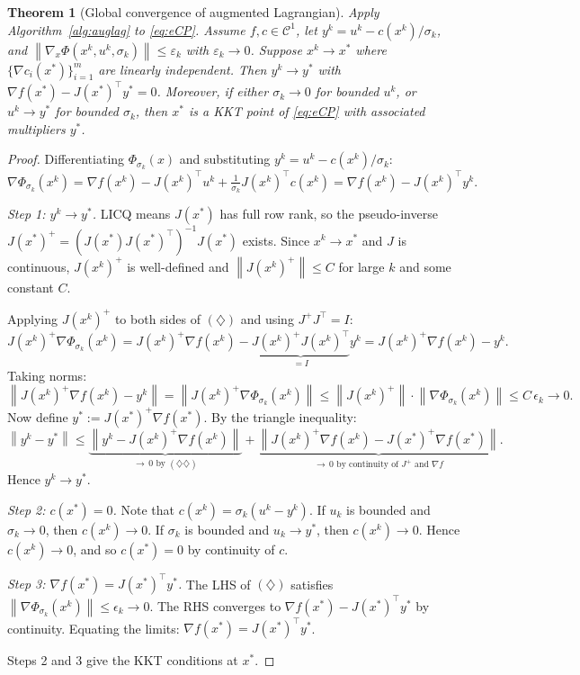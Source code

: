 \documentclass[11pt,a4paper]{report}
\theoremstyle{plain}
\newtheorem{theorem}{Theorem}[chapter]
\theoremstyle{definition}
\newcommand{\norm}[1]{\left\lVert#1\right\rVert}
\newcommand{\grad}{\nabla}
\newcommand{\trans}{^{\top}}
\newcommand{\eps}{\varepsilon}
\begin{document}
\begin{theorem}[Global convergence of augmented Lagrangian]\label{thm:auglag}
Apply Algorithm~\ref{alg:auglag} to \eqref{eq:eCP}. Assume $f,c\in\mathcal{C}^{1}$,
let $y^{k}=u^{k}-c(x^{k})/\sigma_{k}$, and
$\norm{\grad_{x}\Phi(x^{k},u^{k},\sigma_{k})}\le\eps_{k}$ with $\eps_{k}\to 0$.
Suppose $x^{k}\to x^{*}$ where $\{\grad c_{i}(x^{*})\}_{i=1}^{m}$ are linearly
independent. Then $y^{k}\to y^{*}$ with
$\grad f(x^{*})-J(x^{*})\trans y^{*}=0$. Moreover, if either
$\sigma_{k}\to 0$ for bounded $u^{k}$, or $u^{k}\to y^{*}$ for bounded
$\sigma_{k}$, then $x^{*}$ is a KKT point of \eqref{eq:eCP} with associated
multipliers $y^{*}$.
\end{theorem}
\begin{proof}
  Differentiating $\Phi_{\sigma_k}(x)$ and substituting $y^k = u^k - c(x^k)/\sigma_k$:
  \[
  \grad\Phi_{\sigma_k}(x^k) 
  = \grad f(x^k) - J(x^k)\trans u^k + \tfrac{1}{\sigma_k}J(x^k)\trans c(x^k) 
  = \grad f(x^k) - J(x^k)\trans y^k. \tag{$\diamondsuit$}
  \]
  
  \textit{Step 1: $y^k \to y^*$.}
  LICQ means $J(x^*)$ has full row rank, so the pseudo-inverse $J(x^*)^+ = (J(x^*)J(x^*)\trans)^{-1}J(x^*)$ exists. Since $x^k \to x^*$ and $J$ is continuous, $J(x^k)^+$ is well-defined and $\norm{J(x^k)^+} \leq C$ for large $k$ and some constant $C$.
   
  Applying $J(x^k)^+$ to both sides of $(\diamondsuit)$ and using $J^+J\trans = I$:
  \[
  J(x^k)^+\grad\Phi_{\sigma_k}(x^k) 
  = J(x^k)^+\grad f(x^k) - \underbrace{J(x^k)^+J(x^k)\trans}_{= I} y^k 
  = J(x^k)^+\grad f(x^k) - y^k.
  \]
  Taking norms:
  \[
  \norm{J(x^k)^+\grad f(x^k) - y^k} = \norm{J(x^k)^+\grad\Phi_{\sigma_k}(x^k)} \leq \norm{J(x^k)^+}\cdot\norm{\grad\Phi_{\sigma_k}(x^k)} \leq C\,\epsilon_k \to 0. \tag{$\diamondsuit\diamondsuit$}
  \]
  Now define $y^* := J(x^*)^+\grad f(x^*)$. By the triangle inequality:
  \[
  \norm{y^k - y^*} 
  \leq \underbrace{\norm{y^k - J(x^k)^+\grad f(x^k)}}_{\to\,0\text{ by }(\diamondsuit\diamondsuit)} 
  + \underbrace{\norm{J(x^k)^+\grad f(x^k) - J(x^*)^+\grad f(x^*)}}_{\to\,0\text{ by continuity of }J^+\text{ and }\grad f}.
  \]
  Hence $y^k \to y^*$.
   
  \textit{Step 2: $c(x^*) = 0$.}
  Note that $c(x^k) = \sigma_k (u^k - y^k)$. If $u_k$ is bounded and $\sigma_k \to 0$, then $c(x^k) \to 0$. If $\sigma_k$ is bounded and $u_k \to y^*$, then $c(x^k) \to 0$. Hence $c(x^k) \to 0$, and so $c(x^*) = 0$ by continuity of $c$.
   
  \textit{Step 3: $\grad f(x^*) = J(x^*)\trans y^*$.}
  The LHS of $(\diamondsuit)$ satisfies $\norm{\grad\Phi_{\sigma_k}(x^k)} \leq \epsilon_k \to 0$. The RHS converges to $\grad f(x^*) - J(x^*)\trans y^*$ by continuity. Equating the limits: $\grad f(x^*) = J(x^*)\trans y^*$.
   
  \medskip
  Steps 2 and 3 give the KKT conditions at $x^*$.
\end{proof}
\end{document}
